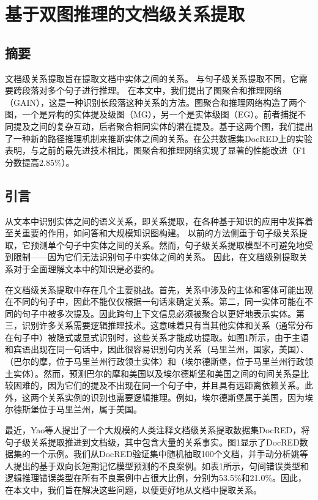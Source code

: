 \documentclass[bachelor]{thesis-uestc}
\begin{document}
\thesistranslationchinese
\section{基于双图推理的文档级关系提取}
\subsection{摘要}
文档级关系提取旨在提取文档中实体之间的关系。
与句子级关系提取不同，它需要跨段落对多个句子进行推理。
在本文中，我们提出了图聚合和推理网络（GAIN），这是一种识别长段落这种关系的方法。图聚合和推理网络构造了两个图，一个是异构的实体提及级图（MG），另一个是实体级图（EG）。前者捕捉不同提及之间的复杂互动，后者聚合相同实体的潜在提及。基于这两个图，我们提出了一种新的路径推理机制来推断实体之间的关系。在公共数据集DocRED上的实验表明，与之前的最先进技术相比，图聚合和推理网络实现了显著的性能改进（F1分数提高2.85\%）。\par

\subsection{引言}

从文本中识别实体之间的语义关系，即关系提取，在各种基于知识的应用中发挥着至关重要的作用，如问答和大规模知识图构建。
以前的方法侧重于句子级关系提取，它预测单个句子中实体之间的关系。然而，句子级关系提取模型不可避免地受到限制——因为它们无法识别句子中实体之间的关系。
因此，在文档级别提取关系对于全面理解文本中的知识是必要的。\par

在文档级关系提取中存在几个主要挑战。首先，关系中涉及的主体和客体可能出现在不同的句子中，因此不能仅仅根据一句话来确定关系。第二，同一实体可能在不同的句子中被多次提及。因此跨句上下文信息必须被聚合以更好地表示实体。第三，识别许多关系需要逻辑推理技术。这意味着只有当其他实体和关系（通常分布在句子中）被隐式或显式识别时，这些关系才能成功提取。如图1所示，由于主语和宾语出现在同一句话中，因此很容易识别句内关系（马里兰州，国家，美国）、（巴尔的摩，位于马里兰州行政领土实体）和（埃尔德斯堡，位于马里兰州行政领土实体）。然而，预测巴尔的摩和美国以及埃尔德斯堡和美国之间的句间关系是比较困难的，因为它们的提及不出现在同一个句子中，并且具有远距离依赖关系。此外，这两个关系实例的识别也需要逻辑推理。例如，埃尔德斯堡属于美国，因为埃尔德斯堡位于马里兰州，属于美国。\par

最近，Yao等人提出了一个大规模的人类注释文档级关系提取数据集DocRED，将句子级关系提取推进到文档级，其中包含大量的关系事实。图1显示了DocRED数据集的一个示例。我们从DocRED验证集中随机抽取100个文档，并手动分析姚等人提出的基于双向长短期记忆模型预测的不良案例。如表1所示，句间错误类型和逻辑推理错误类型在所有不良案例中占很大比例，分别为53.5\%和21.0\%。因此，在本文中，我们旨在解决这些问题，以便更好地从文档中提取关系。\par
\end{document}
